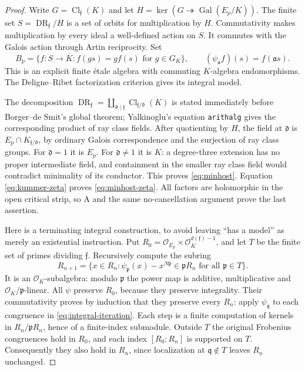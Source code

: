 \begin{proof}
Write $G=\operatorname{Cl}_{\mathfrak f}(K)$ and let
$H=\ker(G\twoheadrightarrow\operatorname{Gal}(E_p/K))$.
The finite set $S=\operatorname{DR}_{\mathfrak f}/H$ is a set
of orbits for multiplication by $H$. Commutativity makes
multiplication by every ideal a well-defined action on $S$.
It commutes with the Galois action through Artin reciprocity.
Set
\[
 B_p=\{f:S\longrightarrow\overline K:
                 f(gs)=g f(s)\text{ for }g\in G_K\},\qquad
 (\psi_{\mathfrak a}f)(s)=f(\mathfrak a s).
\]
This is an explicit finite \'etale algebra with commuting
$K$-algebra endomorphisms. The Deligne--Ribet factorization
criterion gives its integral model.

The decomposition
$\operatorname{DR}_{\mathfrak f}=
 \coprod_{\mathfrak d\mid\mathfrak f}
 \operatorname{Cl}_{\mathfrak f/\mathfrak d}(K)$
is stated immediately before Borger--de Smit's global theorem;
Yalkinoglu's equation \texttt{arithalg} gives the corresponding
product of ray class fields. After quotienting by $H$, the field
at $\mathfrak d$ is
$E_p\cap K_{\mathfrak f/\mathfrak d}$, by ordinary Galois
correspondence and the surjection of ray class groups.
For $\mathfrak d=1$ it is $E_p$. For $\mathfrak d\ne1$ it is
$K$: a degree-three extension has no proper intermediate field,
and containment in the smaller ray class field would contradict
minimality of its conductor. This proves \eqref{eq:minhost}.
Equation \eqref{eq:kummer-zeta} proves \eqref{eq:minhost-zeta}.
All factors are holomorphic in the open critical strip, so A and
the same no-cancellation argument prove the last assertion.

Here is a terminating integral construction, to avoid leaving
``has a model'' as merely an existential instruction. Put
$R_0=\mathcal O_{E_p}\times\mathcal O_K^{d(\mathfrak f)-1}$,
and let $T$ be the finite set of primes dividing $\mathfrak f$.
Recursively compute the subring
\begin{equation}
 R_{n+1}=\{x\in R_n:
 \psi_{\mathfrak p}(x)-x^{N\mathfrak p}
       \in\mathfrak p R_n\text{ for all }\mathfrak p\in T\}.
                                                               \label{eq:integral-iteration}
\end{equation}
It is an $\mathcal O_K$-subalgebra: modulo $\mathfrak p$ the
power map is additive, multiplicative and $\mathcal O_K/\mathfrak p$-linear.
All $\psi$ preserve $R_0$, because they preserve integrality.
Their commutativity proves by induction that they preserve every
$R_n$: apply $\psi_{\mathfrak q}$ to each congruence in
\eqref{eq:integral-iteration}. Each step is a finite computation
of kernels in $R_n/\mathfrak p R_n$, hence of a finite-index
submodule. Outside $T$ the original Frobenius congruences hold
in $R_0$, and each index $[R_0:R_n]$ is supported on $T$.
Consequently they also hold in $R_n$, since localization at
$\mathfrak q\notin T$ leaves $R_n$ unchanged.


\end{proof}
